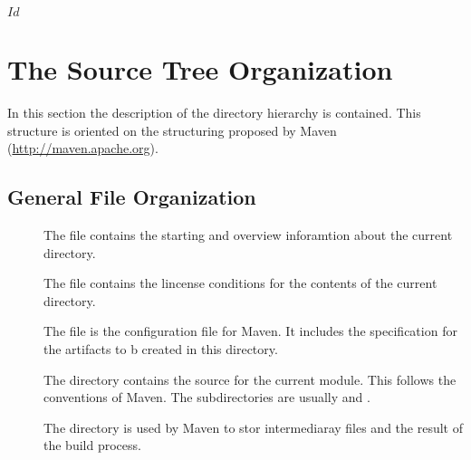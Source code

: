 \SVN$Id$
\chapter{The Source Tree Organization}

In this section the description of the directory hierarchy is
contained. This structure is oriented on the structuring proposed by
Maven (\url{http://maven.apache.org}).


\section{General File Organization}


\begin{description}
\item[] The file  contains the
  starting and overview inforamtion about the current directory.
\item[] The file  contains the
  lincense conditions for the contents of the current directory.
\item[] The file  is the configuration
  file for Maven. It includes the specification for the artifacts to b
  created in this directory.
\item[] The directory  contains the source for the
  current module. This follows the conventions of Maven. The
  subdirectories are usually  and . 
\item[] The directory  is used by Maven to
  stor intermediaray files and the result of the build process.
\end{description}


